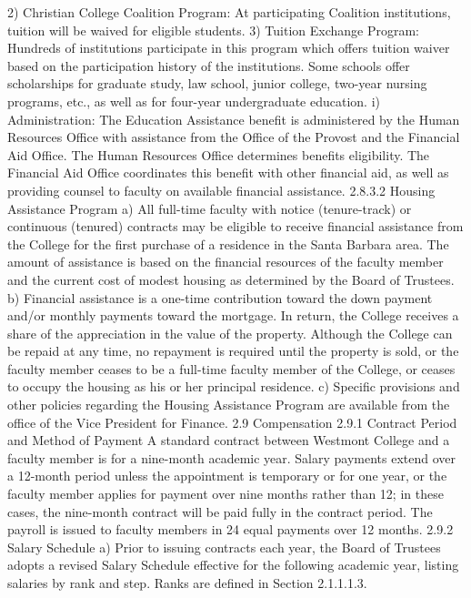 \documentclass[letterpaper, 11pt]{article}
\begin{document}
2) Christian College Coalition Program:  At participating Coalition institutions, tuition will be waived for eligible students.
3) Tuition Exchange Program:  Hundreds of institutions participate in this program which offers tuition waiver based on the participation history of the institutions. Some schools offer scholarships for graduate study, law school, junior college, two-year nursing programs, etc., as well as for four-year undergraduate education.
i) Administration:
   The Education Assistance benefit is administered by the Human Resources Office with assistance from the Office of the Provost and the Financial Aid Office.  The Human Resources Office determines benefits eligibility.  The Financial Aid Office coordinates this benefit with other financial aid, as well as providing counsel to faculty on available financial assistance.
2.8.3.2 Housing Assistance Program
a) All full-time faculty with notice (tenure-track) or continuous (tenured) contracts may be eligible to receive financial assistance from the College for the first purchase of a residence in the Santa Barbara area.  The amount of assistance is based on the financial resources of the faculty member and the current cost of modest housing as determined by the Board of Trustees.
b) Financial assistance is a one-time contribution toward the down payment and/or monthly payments toward the mortgage.  In return, the College receives a share of the appreciation in the value of the property.  Although the College can be repaid at any time, no repayment is required until the property is sold, or the faculty member ceases to be a full-time faculty member of the College, or ceases to occupy the housing as his or her principal residence.
c) Specific provisions and other policies regarding the Housing Assistance Program are available from the office of the Vice President for Finance.
2.9 Compensation
2.9.1 Contract Period and Method of Payment
   A standard contract between Westmont College and a faculty member is for a nine-month academic year.  Salary payments extend over a 12-month period unless the appointment is temporary or for one year, or the faculty member applies for payment over nine months rather than 12; in these cases, the nine-month contract will be paid fully in the contract period.  The payroll is issued to faculty members in 24 equal payments over 12 months.
2.9.2 Salary Schedule
a) Prior to issuing contracts each year, the Board of Trustees adopts a revised Salary Schedule effective for the following academic year, listing salaries by rank and step.  Ranks are defined in Section 2.1.1.1.3.  
\end{document}
